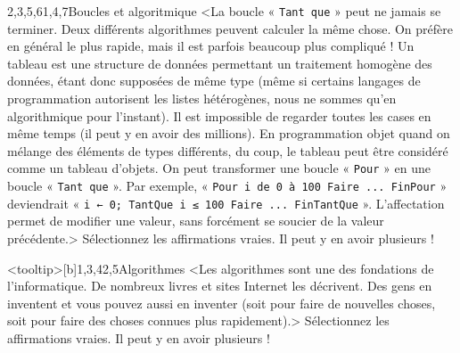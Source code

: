 \begin{quiz}[title={Instructions élémentaires}]
\begin{quizquestion}[c]{2,3,5,6}{1,4,7}{Boucles et algoritmique}
<La boucle « \texttt{Tant que} » peut ne jamais se terminer.
Deux différents algorithmes peuvent calculer la même chose. On préfère en général le plus rapide, mais il est parfois beaucoup plus compliqué !
Un tableau est une structure de données permettant un traitement homogène des données, étant donc supposées de même type (même si certains langages de programmation autorisent les listes hétérogènes, nous ne sommes qu'en algorithmique pour l'instant). Il est impossible de regarder toutes les cases en même temps (il peut y en avoir des millions). En programmation objet quand on mélange des éléments de types différents, du coup, le tableau peut être considéré comme un tableau d'objets.
On peut transformer une boucle « \texttt{Pour} » en une boucle « \texttt{Tant que} ». Par exemple,
« \texttt{Pour i de 0 à 100 Faire ... FinPour} » deviendrait « \texttt{i ← 0; TantQue i ≤ 100 Faire ... FinTantQue} ».
L'affectation permet de modifier une valeur, sans forcément se soucier de la valeur précédente.>
Sélectionnez les affirmations vraies. Il peut y en avoir plusieurs !
\end{quizquestion}
\end{quiz}

\begin{quiz}[title={Culture algoritmique}]
\vspace{-\baselineskip}
\begin{quizquestion}<tooltip>[b]{1,3,4}{2,5}{Algorithmes}
<Les algorithmes sont une des fondations de l'informatique. De nombreux livres et sites Internet les décrivent. Des gens en inventent et vous pouvez aussi en inventer (soit pour faire de nouvelles choses, soit pour faire des choses connues plus rapidement).>
Sélectionnez les affirmations vraies. Il peut y en avoir plusieurs !
\end{quizquestion}
\end{quiz}

